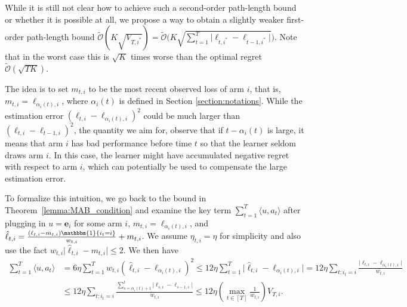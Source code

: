 \documentclass[final, 12pt]{colt2018} %
\newcommand{\inn}[1]{ \langle {#1} \rangle }
\newcommand{\abs}[1]{ \lvert {#1} \rvert }
\begin{document}
While it is still not clear how to achieve such a second-order path-length bound or whether it is possible at all,
we propose a way to obtain a slightly weaker first-order path-length bound 
$\tilde{\mathcal{O}}\left(K\sqrt{V_{T,i^*}}\right)=\tilde{\mathcal{O}}\Big(K\sqrt{\sum_{t=1}^T\abs{\ell_{t,i^*}-\ell_{t-1,i^*}}}\Big)$.
Note that in the worst case this is $\sqrt{K}$ times worse than the optimal regret $\tilde{\mathcal{O}}(\sqrt{TK})$.


The idea is to set $m_{t,i}$ to be the most recent observed loss of arm $i$, that is, $m_{t,i}=\ell_{\alpha_i(t),i}$, where $\alpha_i(t)$ is defined in Section \ref{section:notations}.
While the estimation error $(\ell_{t,i}-\ell_{\alpha_i(t),i})^2$ could be much larger than $(\ell_{t,i}-\ell_{t-1,i})^2$, the quantity we aim for, 
observe that %
if $t-\alpha_i(t)$ is large, it means that arm $i$ has bad performance before time $t$ so that the learner seldom draws arm $i$.
In this case, the learner might have accumulated negative regret with respect to arm $i$, which can potentially be used to compensate the large estimation error. 

To formalize this intuition, we go back to the bound in Theorem~\ref{lemma:MAB_condition} and examine the key term $\sum_{t=1}^T \inn{u, a_t}$
after plugging in $u = \mathbf{e}_i$ for some arm $i$, $m_{t,i}=\ell_{\alpha_i(t),i}$, and $\hat{\ell}_{t,i}=\frac{(\ell_{t,i}-m_{t,i})\mathbbm{1}\{i_t=i\}}{w_{t,i}}+m_{t,i}$. 
We assume $\eta_{t,i}=\eta$ for simplicity and also use the fact $w_{t,i}\abs{\hat{\ell}_{t,i}-m_{t,i}}\leq 2$.
We then have
\begin{align}
\sum_{t=1}^T \inn{u,a_t}&=6\eta\sum_{t=1}^T w_{t,i}(\hat{\ell}_{t,i}-\ell_{\alpha_i(t),i})^2 \leq 12\eta\sum_{t=1}^T \abs{\hat{\ell}_{t,i}-\ell_{\alpha_i(t),i}}
= 12\eta\sum_{t: i_t=i} \frac{\abs{\ell_{t,i}-\ell_{\alpha_i(t),i}} }{w_{t,i}} \nonumber \\
&\leq 12\eta\sum_{t: i_t=i} \frac{\sum_{s=\alpha_i(t)+1}^t \abs{\ell_{s,i}-\ell_{s-1,i}} }{w_{t,i}}  
\leq12\eta \left(\max_{t\in[T]} \frac{1}{w_{t,i}}\right) V_{T,i}. \label{eqn:path_length_trick}
\end{align}
\end{document}
